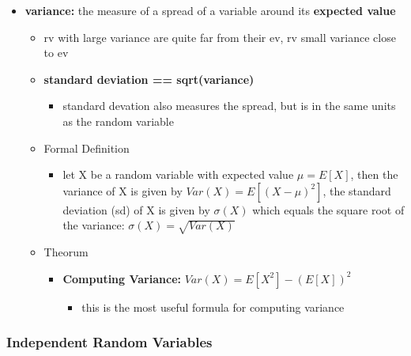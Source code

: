 \documentclass[
]{article}
\providecommand{\tightlist}{%
  \setlength{\itemsep}{0pt}\setlength{\parskip}{0pt}}
\begin{document}
\begin{itemize}
\tightlist
\item
  \textbf{variance:} the measure of a spread of a variable around its
  \textbf{expected value}

  \begin{itemize}
  \tightlist
  \item
    rv with large variance are quite far from their ev, rv small
    variance close to ev
  \item
    \textbf{standard deviation == sqrt(variance)}

    \begin{itemize}
    \tightlist
    \item
      standard devation also measures the spread, but is in the same
      units as the random variable
    \end{itemize}
  \item
    Formal Definition

    \begin{itemize}
    \tightlist
    \item
      let X be a random variable with expected value \(\mu = E[X]\),
      then the variance of X is given by \(Var(X) = E[(X - \mu)^{2}]\),
      the standard deviation (sd) of X is given by \(\sigma (X)\) which
      equals the square root of the variance:
      \(\sigma (X) = \sqrt{Var(X)}\)
    \end{itemize}
  \item
    Theorum

    \begin{itemize}
    \tightlist
    \item
      \textbf{Computing Variance:} \(Var(X) = E[X^{2}] - (E[X])^{2}\)

      \begin{itemize}
      \tightlist
      \item
        this is the most useful formula for computing variance
      \end{itemize}
    \end{itemize}
  \end{itemize}
\end{itemize}

\hypertarget{independent-random-variables}{%
\subsubsection{Independent Random
Variables}\label{independent-random-variables}}
\end{document}
